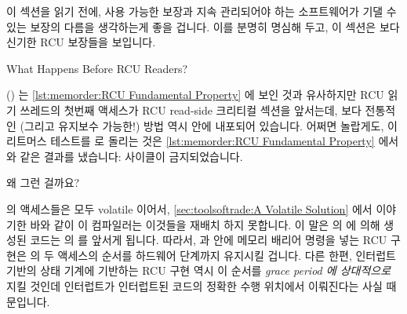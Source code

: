 이 섹션을 읽기 전에, 사용 가능한 보장과 지속 관리되어야 하는 소프트웨어가 기댈
수 있는 보장의 다름을 생각하는게 좋을 겁니다.
이를 분명히 명심해 두고, 이 섹션은 보다 신기한 RCU 보장들을 보입니다.

\begin{listing}[tbp]

\caption{What Happens Before RCU Readers?}
\label{lst:memorder:What Happens Before RCU Readers?}
\end{listing}

()
는
\cref{lst:memorder:RCU Fundamental Property} 에 보인 것과 유사하지만 RCU 읽기
쓰레드의 첫번째 액세스가 RCU read-side 크리티컬 섹션을 앞서는데, 보다 전통적인
(그리고 유지보수 가능한!) 방법 역시 안에 내포되어 있습니다.
어쩌면 놀랍게도, 이 리트머스 테스트를  로 돌리는 것은
\cref{lst:memorder:RCU Fundamental Property} 에서와 같은 결과를 냈습니다:
사이클이 금지되었습니다.

왜 그런 걸까요?

 의 액세스들은 모두 volatile 이어서,
\cref{sec:toolsoftrade:A Volatile Solution} 에서 이야기한 바와 같이 이
컴파일러는 이것들을 재배치 하지 못합니다.
이 말은  의  에 의해 생성된 코드는  의
 를 앞서게 됩니다.
따라서,  과  안에 메모리 배리어
명령을 넣는 RCU 구현은  의 두 액세스의 순서를 하드웨어 단계까지
유지시킬 겁니다.
다른 한편, 인터럽트 기반의 상태 기계에 기반하는 RCU 구현 역시 이 순서를
\emph{grace period 에 상대적으로} 지킬 것인데 인터럽트가 인터럽트된 코드의
정확한 수행 위치에서 이뤄진다는 사실 때문입니다.

